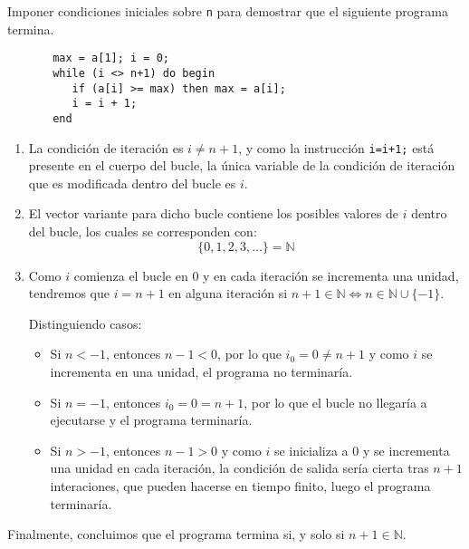 \begin{ejemplo}
    Imponer condiciones iniciales sobre \verb|n| para demostrar que el siguiente programa termina.
    \begin{verbatim}
       max = a[1]; i = 0;
       while (i <> n+1) do begin
          if (a[i] >= max) then max = a[i];
          i = i + 1;
       end
    \end{verbatim}
    \begin{enumerate}
        \item La condición de iteración es $i \neq n+1$, y como la instrucción \verb|i=i+1;| está presente en el cuerpo del bucle, la única variable de la condición de iteración que es modificada dentro del bucle es $i$.
        \item El vector variante para dicho bucle contiene los posibles valores de $i$ dentro del bucle, los cuales se corresponden con:
            \begin{equation*}
                \{0, 1, 2, 3, \ldots\} = \mathbb{N}
            \end{equation*}
        \item Como $i$ comienza el bucle en $0$ y en cada iteración se incrementa una unidad, tendremos que $i= n+1$ en alguna iteración si $n+1 \in \mathbb{N}\Longleftrightarrow n\in \mathbb{N} \cup \{-1\}$. 

            Distinguiendo casos:
            \begin{itemize}
                \item Si $n < -1$, entonces $n-1<0$, por lo que $i_0 = 0 \neq n+1$ y como $i$ se incrementa en una unidad, el programa no terminaría.
                \item Si $n = -1$, entonces $i_0 = 0 = n+1$, por lo que el bucle no llegaría a ejecutarse y el programa terminaría.
                \item Si $n>-1$, entonces $n-1>0$ y como $i$ se inicializa a $0$ y se incrementa una unidad en cada iteración, la condición de salida sería cierta tras $n+1$ interaciones, que pueden hacerse en tiempo finito, luego el programa terminaría.
            \end{itemize}
    \end{enumerate}
    Finalmente, concluimos que el programa termina si, y solo si $n+1\in \mathbb{N}$.
\end{ejemplo}
